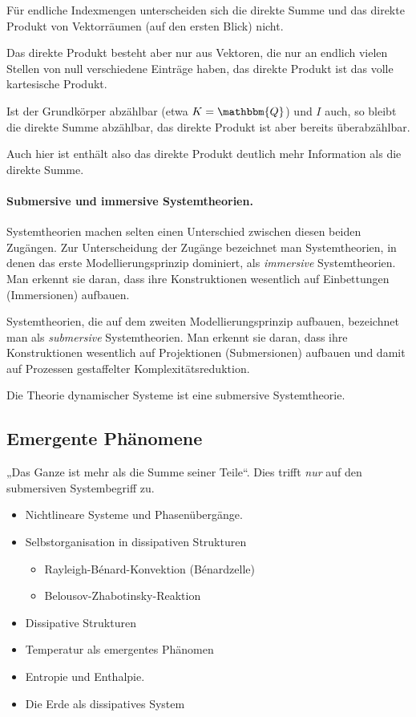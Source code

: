 \documentclass[11pt,a4paper]{article}
\begin{document}
Für endliche Indexmengen unterscheiden sich die direkte Summe und das direkte
Produkt von Vektorräumen (auf den ersten Blick) nicht.

Das direkte Produkt besteht aber nur aus Vektoren, die nur an endlich vielen
Stellen von null verschiedene Einträge haben, das direkte Produkt ist das
volle kartesische Produkt.

Ist der Grundkörper abzählbar (etwa $K=\mathbbm{Q}$) und $I$ auch, so bleibt
die direkte Summe abzählbar, das direkte Produkt ist aber bereits
überabzählbar.

Auch hier ist enthält also das direkte Produkt deutlich mehr Information als
die direkte Summe.

\paragraph{Submersive und immersive Systemtheorien.}
Systemtheorien machen selten einen Unterschied zwischen diesen beiden
Zugängen.  Zur Unterscheidung der Zugänge bezeichnet man Systemtheorien, in
denen das erste Modellierungsprinzip dominiert, als \emph{immersive}
Systemtheorien. Man erkennt sie daran, dass ihre Konstruktionen wesentlich auf
Einbettungen (Immersionen) aufbauen.

Systemtheorien, die auf dem zweiten Modellierungsprinzip aufbauen, bezeichnet
man als \emph{submersive} Systemtheorien.  Man erkennt sie daran, dass ihre
Konstruktionen wesentlich auf Projektionen (Submersionen) aufbauen und damit
auf Prozessen gestaffelter Komplexitätsreduktion.

Die Theorie dynamischer Systeme ist eine submersive Systemtheorie.

\subsection{Emergente Phänomene}

„Das Ganze ist mehr als die Summe seiner Teile“. Dies trifft \emph{nur} auf
den submersiven Systembegriff zu.

\begin{itemize}[noitemsep]
\item Nichtlineare Systeme und Phasenübergänge.
\item Selbstorganisation in dissipativen Strukturen
  \begin{itemize}[noitemsep]
  \item Rayleigh-Bénard-Konvektion (Bénardzelle)
  \item Belousov-Zhabotinsky-Reaktion
  \end{itemize}
\item Dissipative Strukturen
\item Temperatur als emergentes Phänomen
\item {Entropie} und {Enthalpie}.
\item Die Erde als dissipatives System
\end{itemize}
\end{document}
